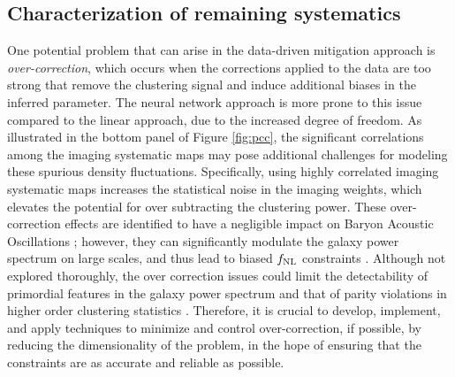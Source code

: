 \subsection{Characterization of remaining systematics}
\label{ssec:characterization}
One potential problem that can arise in the data-driven mitigation approach is \textit{over-correction}, which occurs when the corrections applied to the data are too strong that remove the clustering signal and induce additional biases in the inferred parameter. The neural network approach is more prone to this issue compared to the linear approach, due to the increased degree of freedom. As illustrated in the bottom panel of Figure \ref{fig:pcc}, the significant correlations among the imaging systematic maps may pose additional challenges for modeling these spurious density fluctuations. Specifically, using highly correlated imaging systematic maps increases the statistical noise in the imaging weights, which elevates the potential for over subtracting the clustering power. These over-correction effects are identified to have a negligible impact on Baryon Acoustic Oscillations \citep{merz2021clustering}; however, they can significantly modulate the galaxy power spectrum on large scales, and thus lead to biased $f_{\rm NL}$ constraints \citep{rezaie2021primordial, mueller2022primordial}. Although not explored thoroughly, the over correction issues could limit the detectability of primordial features in the galaxy power spectrum and that of parity violations in higher order clustering statistics \citep{beutler2019primordial, cahn2021test, philcox2022probing}. Therefore, it is crucial to develop, implement, and apply techniques to minimize and control over-correction, if possible, by reducing the dimensionality of the problem, in the hope of ensuring that the constraints are as accurate and reliable as possible. 
